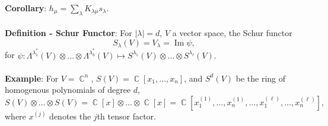 \documentclass{article}
\DeclareMathOperator{\C}{\mathbb{C}}
\DeclareMathOperator{\im}{Im}
\begin{document}
\textbf{Corollary}: $h_\mu = \sum_\lambda K_{\lambda \mu} s_\lambda$. \\ \\
\textbf{Definition - Schur Functor}: For $|\lambda| = d$, $V$ a vector space, the Schur functor $$S_\lambda(V) = V_\lambda = \im \psi,$$ for $\psi: \Lambda^{\lambda_1^*}(V) \otimes \dots \otimes \Lambda^{\lambda_k^*}(V) \mapsto S^{\lambda_1}(V) \otimes \dots \otimes S^{\lambda_\ell}(V).$ \\ \\
\textbf{Example}: For $V = \C^n$, $S(V) = \C[x_1, \dots, x_n]$, and $S^d(V)$ be the ring of homogenous polynomials of degree $d$, $$S(V) \otimes \dots \otimes S(V) = \C[x] \otimes \dots \otimes \C[x] = \C[x_1^{(1)}, \dots, x_n^{(1)}, \dots, x_1^{(\ell)}, \dots, x_n^{(\ell)}],$$ where $x^{(j)}$ denotes the $j$th tensor factor. \\ \\
\end{document}
